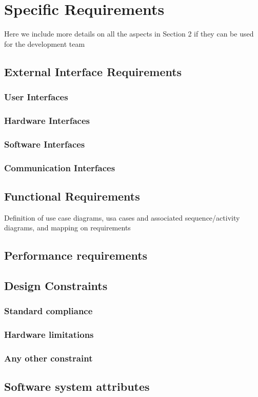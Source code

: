 \documentclass{article}
\begin{document}
\section{Specific Requirements} Here we include more details on all the aspects in Section 2 if they can be used for the development team
	\subsection{External Interface Requirements}
		\subsubsection{User Interfaces}
		\subsubsection{Hardware Interfaces}
		\subsubsection{Software Interfaces}
		\subsubsection{Communication Interfaces}
	\subsection{Functional Requirements} Definition of use case diagrams, usa cases and associated sequence/activity diagrams, and mapping on requirements
	\subsection{Performance requirements}
	\subsection{Design Constraints}
		\subsubsection{Standard compliance}
		\subsubsection{Hardware limitations}
		\subsubsection{Any other constraint}
	\subsection{Software system attributes}
\end{document}
